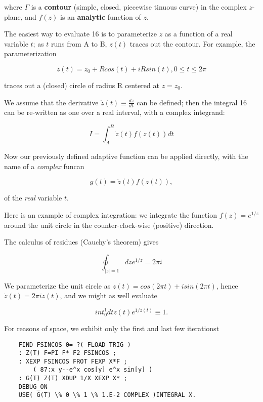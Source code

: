 where $\Gamma$ is a \textbf{contour} (simple, closed, piecewise tinuous curve) in the complex $z$-plane, and $f(z)$ is an \textbf{analytic} function of $z$.

The easiest way to evaluate 16 is to parameterize $z$ as a function of a real variable $t$; as $t$ runs from A to B, $z(t)$ traces out the contour. For example, the parameterization

\begin{equation}
z(t) = z_0 + R cos(t) + iR sin(t) , 0 \leq t \leq 2\pi
\end{equation}

traces out a (closed) circle of radius R centered at $z = z_0$.

We assume that the derivative $\dot{z}(t)\equiv \frac{dz}{dt}$ can be defined; then the integral 16 can be re-written as one over a real interval, with a complex integrand:

\begin{equation}
I = \int_{A}^{B} \dot{z}(t)f\left( z(t) \right) dt
\end{equation}

Now our previously defined adaptive function  can be applied directly, with  the name of a \textit{complex} funcan

\begin{equation}
g(t) = \dot{z}(t)f\left( z(t) \right),
\end{equation}

of the \textit{real} variable $t$.

Here is an example of complex integration: we integrate the function $f(z) = e^{1/z}$ around the unit circle in the counter-clock-wise (positive) direction.

The calculus of residues (Cauchy's theorem) gives

\begin{equation}
\oint_{ \vert z \vert =1} dz e^{1/z} = 2\pi i
\end{equation}

We parameterize the unit circle as $z(t) = cos(2\pi t) + i sin(2\pi t)$, hence $\dot{z}(t) = 2\pi iz(t)$, and we might as well evaluate

\begin{equation}
int_{0}^{1} dt z(t) e^{1/z(t)} \equiv 1.
\end{equation}

For reasons of space, we exhibit only the first and last few iterationst

\begin{lstlisting}
    FIND FSINCOS 0= ?( FLOAD TRIG )
    : Z(T) F=PI F* F2 FSINCOS ;
    : XEXP FSINCOS FROT FEXP X*F ;
        ( 87:x y--e^x cos[y] e^x sin[y] )
    : G(T) Z(T) XDUP 1/X XEXP X* ;
    DEBUG_ON
    USE( G(T) \% 0 \% 1 \% 1.E-2 COMPLEX )INTEGRAL X.
\end{lstlisting}

